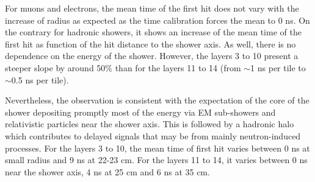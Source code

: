 For muons and electrons, the mean time of the first hit does not vary with the increase of radius as expected as the time calibration forces the mean to 0 ns. On the contrary for hadronic showers, it shows an increase of the mean time of the first hit as function of the hit distance to the shower axis. As well, there is no dependence on the energy of the shower. However, the layers 3 to 10 present a steeper slope by around 50\% than for the layers 11 to 14 (from $\sim$1 ns per tile to $\sim$0.5 ns per tile).

Nevertheless, the observation is consistent with the expectation of the core of the shower depositing promptly most of the energy via EM sub-showers and relativistic particles near the shower axis. This is followed by a hadronic halo which contributes to delayed signals that may be from mainly neutron-induced processes. For the layers 3 to 10, the mean time of first hit varies between 0 ns at small radius and 9 ns at 22-23 cm. For the layers 11 to 14, it varies between 0 ns near the shower axis, 4 ns at 25 cm and 6 ns at 35 cm.

